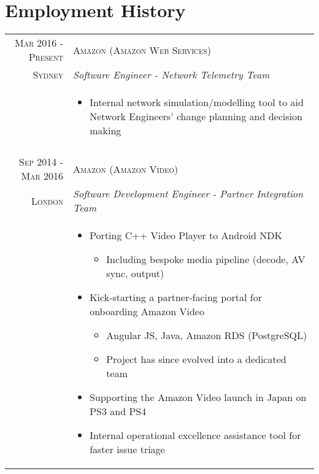 \section*{Employment History}

\begin{tabular}{r|p{11cm}}

\textsc{Mar 2016 - Present} & \textsc{Amazon (Amazon Web Services)}\\
\textsc{Sydney} & \emph{Software Engineer - Network Telemetry Team}\\
& \begin{footnotesize}
\begin{itemize}
	\vspace*{-\baselineskip}
	\item Internal network simulation/modelling tool to aid Network Engineers' change planning and decision making
	\vspace*{-\baselineskip}
\end{itemize}
\end{footnotesize}\\

\multicolumn{2}{c}{} \\

\textsc{Sep 2014 - Mar 2016} & \textsc{Amazon (Amazon Video)}\\
\textsc{London} & \emph{Software Development Engineer - Partner Integration Team}\\
& \begin{footnotesize}
\begin{itemize}
	\vspace*{-\baselineskip}
	\item Porting C++ Video Player to Android NDK
		\begin{itemize}
		\item Including bespoke media pipeline (decode, AV sync, output)
		\end{itemize}
	\item Kick-starting a partner-facing portal for onboarding Amazon Video
		\begin{itemize}
		\item Angular JS, Java, Amazon RDS (PostgreSQL)
		\item Project has since evolved into a dedicated team
		\end{itemize}
	\item Supporting the Amazon Video launch in Japan on PS3 and PS4
	\item Internal operational excellence assistance tool for faster issue triage
	\vspace*{-\baselineskip}
\end{itemize}
\end{footnotesize}\\


\end{tabular}
